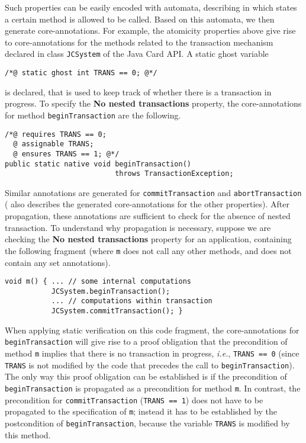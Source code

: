 Such properties can be easily encoded with automata, describing in
which states a certain method is allowed to be called. Based on this
automata, we then generate core-annotations. For example, the
atomicity properties above give rise to core-annotations for the
methods related to the transaction mechanism declared in class
\texttt{JCSystem} of the Java Card API. A static ghost variable 
\begin{verbatim}
/*@ static ghost int TRANS == 0; @*/
\end{verbatim}
is declared, that is used to keep track of whether there is a
transaction in progress.  To specify the \textbf{No nested
transactions} property, the core-annotations for method
\texttt{beginTransaction} are the following. 

\begin{verbatim}
/*@ requires TRANS == 0;
  @ assignable TRANS;
  @ ensures TRANS == 1; @*/
public static native void beginTransaction() 
                          throws TransactionException;
\end{verbatim}
Similar annotations are generated for \texttt{commitTransaction} and
\texttt{abort\-Trans\-action} (\cite{PavlovaBBHL04} also
describes the generated core-annotations for the other
properties). After propagation, these annotations are sufficient to
check for the absence of nested transaction.  To understand why
propagation is necessary, suppose we are checking the \textbf{No
nested transactions} property for an application, containing the
following fragment (where
\texttt{m} does not call any other methods, and does not contain any
set annotations).

\begin{verbatim}
void m() { ... // some internal computations
           JCSystem.beginTransaction();
           ... // computations within transaction
           JCSystem.commitTransaction(); }
\end{verbatim}

When applying static verification on this code fragment, the
core-annotations for \texttt{beginTransaction} will give rise to a
proof obligation that the precondition of method
\texttt{m} implies that there is no transaction in progress,
\emph{i.e.}, \texttt{TRANS == 0} (since \texttt{TRANS} is not modified
by the code that precedes the call to \texttt{beginTransaction}). The
only way this proof obligation can be established is if the
precondition of \texttt{beginTransaction} is propagated as a
precondition for method \texttt{m}. In contrast, the precondition for
\texttt{commitTransaction} (\texttt{TRANS == 1}) does not have to be
propagated to the specification of \texttt{m}; instead it has to be
established by the postcondition of \texttt{begin\-Transaction},
because the variable \texttt{TRANS} is modified by this method.

